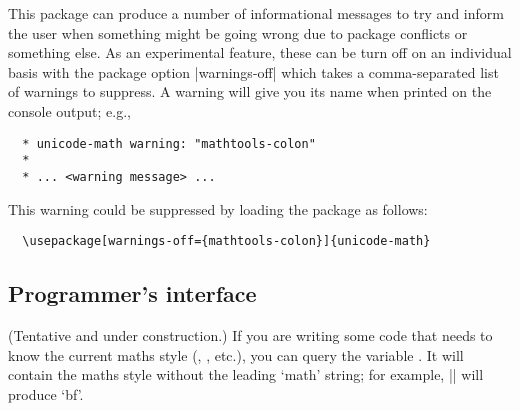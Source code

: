 This package can produce a number of informational messages to try and inform the user when something might be going wrong due to package conflicts or something else.
As an experimental feature, these can be turn off on an individual basis with the package option |warnings-off| which takes a comma-separated list of warnings to suppress.
A warning will give you its name when printed on the console output; e.g.,
\begin{Verbatim}
  * unicode-math warning: "mathtools-colon"
  *
  * ... <warning message> ...
\end{Verbatim}
This warning could be suppressed by loading the package as follows:
\begin{Verbatim}
  \usepackage[warnings-off={mathtools-colon}]{unicode-math}
\end{Verbatim}

\subsection{Programmer's interface}

(Tentative and under construction.)
If you are writing some code that needs to know the current
maths style (, , etc.), you can query the
variable . It will contain the maths style
without the leading `math' string; for example,
||
will produce `bf'.

\endinput

%
%
